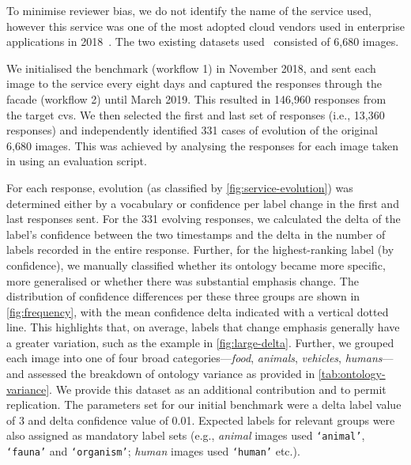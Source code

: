 To minimise reviewer bias, we do not identify the name of the service used, however this service was one of the most adopted cloud vendors used in enterprise applications in 2018~\citep{RightScaleInc:2018kJ}. The two existing datasets used~\citep{Cummaudo:2019icsme,Lin:2014vma} consisted of 6,680 images. 

We initialised the benchmark (workflow 1) in November 2018, and sent each image to the service every eight days and captured the  responses through the facade  (workflow 2) until March 2019. This resulted in 146,960  responses from the target \gls{cvs}. We then selected the first and last set of  responses (i.e., 13,360 responses) and independently identified 331 cases of evolution of the original 6,680 images.  This was achieved by analysing the  responses for each image taken in using an evaluation script.

For each  response, evolution (as classified by \cref{fig:service-evolution}) was determined either by a vocabulary or confidence per label change in the first and last responses sent. For the 331 evolving responses, we calculated the delta of the label's confidence between the two timestamps and the delta in the number of labels recorded in the entire response. Further, for the highest-ranking label (by confidence), we manually classified whether its ontology became more specific, more generalised or whether there was substantial emphasis change. The distribution of confidence differences per these three groups are shown in \cref{fig:frequency}, with the mean confidence delta indicated with a vertical dotted line. This highlights that, on average, labels that change emphasis generally have a greater variation, such as the example in \cref{fig:large-delta}. Further, we grouped each image into one of four broad categories---\textit{food}, \textit{animals}, \textit{vehicles}, \textit{humans}---and assessed the breakdown of ontology variance as provided in \cref{tab:ontology-variance}. We provide this dataset as an additional contribution and to permit replication.
The parameters set for our initial benchmark were a delta label value of 3 and delta confidence value of 0.01. Expected labels for relevant groups were also assigned as mandatory label sets (e.g., \textit{animal} images used \texttt{`animal'}, \texttt{`fauna'} and \texttt{`organism'}; \textit{human} images used \texttt{`human'} etc.).


